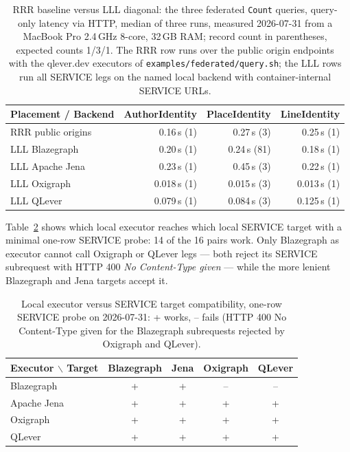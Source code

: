 \documentclass[
]{ceurart}
\begin{document}
\begin{table}
\caption{RRR baseline versus LLL diagonal: the three federated
\texttt{Count} queries, query-only latency via HTTP, median of three runs,
measured 2026-07-31 from a MacBook Pro 2.4\,GHz 8-core, 32\,GB RAM; record
count in parentheses, expected counts 1/3/1. The RRR row runs over the
public origin endpoints with the qlever.dev executors of
\texttt{examples/federated/query.sh}; the LLL rows run all SERVICE legs on
the named local backend with container-internal SERVICE URLs.}
\label{tab:llldiagonal}
\begin{tabular}{lrrr}
\hline
Placement / Backend & AuthorIdentity & PlaceIdentity & LineIdentity \\
\hline
RRR public origins & 0.16\,s (1) & 0.27\,s (3) & 0.25\,s (1) \\
\hline
LLL Blazegraph  & 0.20\,s (1)  & 0.24\,s (81) & 0.18\,s (1) \\
LLL Apache Jena & 0.23\,s (1)  & 0.45\,s (3)  & 0.22\,s (1) \\
LLL Oxigraph    & 0.018\,s (1) & 0.015\,s (3) & 0.013\,s (1) \\
LLL QLever      & 0.079\,s (1) & 0.084\,s (3) & 0.125\,s (1) \\
\hline
\end{tabular}
\end{table}

Table~\ref{tab:servicematrix} shows which local executor reaches which local SERVICE target with a minimal one-row SERVICE probe: 14 of the 16 pairs work. Only Blazegraph as executor cannot call Oxigraph or QLever legs --- both reject its SERVICE subrequest with HTTP 400 \emph{No Content-Type given} --- while the more lenient Blazegraph and Jena targets accept it.

\begin{table}
\caption{Local executor versus SERVICE target compatibility, one-row SERVICE
probe on 2026-07-31: + works, -- fails (HTTP 400 No Content-Type given for
the Blazegraph subrequests rejected by Oxigraph and QLever).}
\label{tab:servicematrix}
\begin{tabular}{lcccc}
\hline
Executor $\backslash$ Target & Blazegraph & Jena & Oxigraph & QLever \\
\hline
Blazegraph  & + & + & -- & -- \\
Apache Jena & + & + & +  & +  \\
Oxigraph    & + & + & +  & +  \\
QLever      & + & + & +  & +  \\
\hline
\end{tabular}
\end{table}
\end{document}
